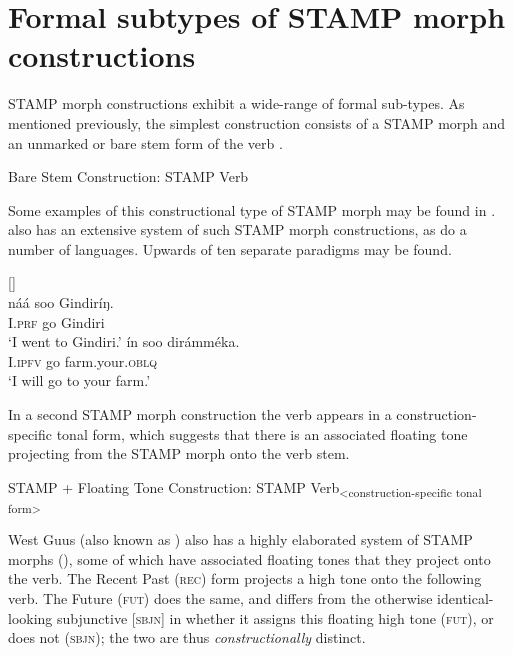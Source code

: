 \documentclass[output=paper]{langsci/langscibook}
\begin{document}
\section{Formal subtypes of STAMP morph constructions}\label{sec:Anderson:4}


STAMP morph constructions exhibit a wide-range of formal sub-types. As mentioned previously, the simplest construction consists of a STAMP morph and an unmarked or bare stem form of the verb .

\ea\label{ex:anderson:10}
Bare Stem Construction:  STAMP  Verb
\z

Some examples of this constructional type of STAMP morph may be found in  .  also has an extensive system of such STAMP morph constructions, as do a number of  languages. Upwards of ten separate paradigms may be found.

\ea\label{ex:anderson:11}
\ea\label{ex:anderson:11a}
 \citep[32, 35]{Nettle1998}          []\\
\gll   náá  soo  Gindiríŋ.    \\
\textsc{I.prf}  go  Gindiri  \\
\glt `I went to Gindiri.'   
\ex \label{ex:anderson:11b}
\gll ín  soo  dirámméka.\\
\textsc{I.ipfv}  go  farm.your.\textsc{oblq}\\
\glt `I will go to your farm.'
\z
\z

In a second STAMP morph construction the verb appears in a construction-specific tonal form, which suggests that there is an associated floating tone projecting from the STAMP morph onto the verb stem.

\ea\label{ex:anderson:12}
 STAMP + Floating Tone Construction:   STAMP Verb\textsubscript{<construction-specific tonal form>}  
 \z

West  Guus (also known as ) also has a highly elaborated system of STAMP morphs (), some of which have associated floating tones that they project onto the verb. The Recent Past (\textsc{rec)} form projects a high tone onto the following verb. The Future (\textsc{fut)} does the same, and differs from the otherwise identical-looking subjunctive [\textsc{sbjn]} in whether it assigns this floating high tone (\textsc{fut}), or does not (\textsc{sbjn}); the two are thus \textit{constructionally} distinct.
\end{document}
